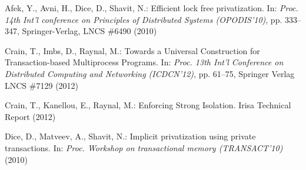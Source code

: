 \documentclass[runningheads,a4paper]{llncs}
\begin{document}

\begin{thebibliography}{4}










 Afek, Y.,  Avni, H.,   Dice, D.,  Shavit, N.: Efficient lock free privatization. 
In: {\it Proc.  14th Int'l conference on Principles of Distributed Systems 
(OPODIS'10)}, pp. 333--347, Springer-Verlag,  LNCS \#6490 (2010) 

Crain, T., Imbs, D.,  Raynal, M.: 
Towards a Universal Construction for Transaction-based Multiprocess Programs.
In: {\it Proc. 13th Int'l Conference on Distributed Computing and Networking (ICDCN'12)}, 
pp. 61--75, Springer Verlag LNCS \#7129 (2012) 

Crain, T., Kanellou, E.,  Raynal, M.: 
Enforcing Strong Isolation.
Irisa Technical Report (2012) 

Dice, D., Matveev, A.,  Shavit, N.:
Implicit privatization using private transactions. 
In: {\it Proc. Workshop on transactional memory (TRANSACT'10)} (2010)


\end{thebibliography}
\end{document}
